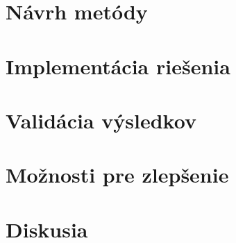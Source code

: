 \section{Návrh metódy}
\section{Implementácia riešenia}
\section{Validácia výsledkov}
\section{Možnosti pre zlepšenie}
\section{Diskusia}
